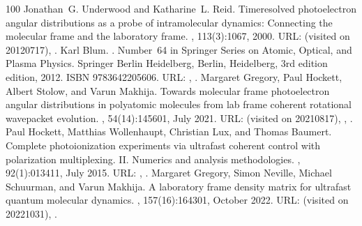 \documentclass[letterpaper,table,10pt,english]{jupyterBook}
\begin{document}
\begin{sphinxthebibliography}{100}
\sphinxAtStartPar
Jonathan G. Underwood and Katharine L. Reid. Time\sphinxhyphen{}resolved photoelectron angular distributions as a probe of intramolecular dynamics: Connecting the molecular frame and the laboratory frame. , 113(3):1067, 2000. URL:  (visited on 2012\sphinxhyphen{}07\sphinxhyphen{}17), .
\sphinxAtStartPar
Karl Blum. . Number 64 in Springer Series on Atomic, Optical, and Plasma Physics. Springer Berlin Heidelberg, Berlin, Heidelberg, 3rd edition edition, 2012. ISBN 978\sphinxhyphen{}3\sphinxhyphen{}642\sphinxhyphen{}20560\sphinxhyphen{}6. URL: , .
\sphinxAtStartPar
Margaret Gregory, Paul Hockett, Albert Stolow, and Varun Makhija. Towards molecular frame photoelectron angular distributions in polyatomic molecules from lab frame coherent rotational wavepacket evolution. , 54(14):145601, July 2021. URL:  (visited on 2021\sphinxhyphen{}08\sphinxhyphen{}17), , .
\sphinxAtStartPar
Paul Hockett, Matthias Wollenhaupt, Christian Lux, and Thomas Baumert. Complete photoionization experiments via ultrafast coherent control with polarization multiplexing. II. Numerics and analysis methodologies. , 92(1):013411, July 2015. URL: , .
\sphinxAtStartPar
Margaret Gregory, Simon Neville, Michael Schuurman, and Varun Makhija. A laboratory frame density matrix for ultrafast quantum molecular dynamics. , 157(16):164301, October 2022. URL:  (visited on 2022\sphinxhyphen{}10\sphinxhyphen{}31), .

\end{sphinxthebibliography}
\end{document}
